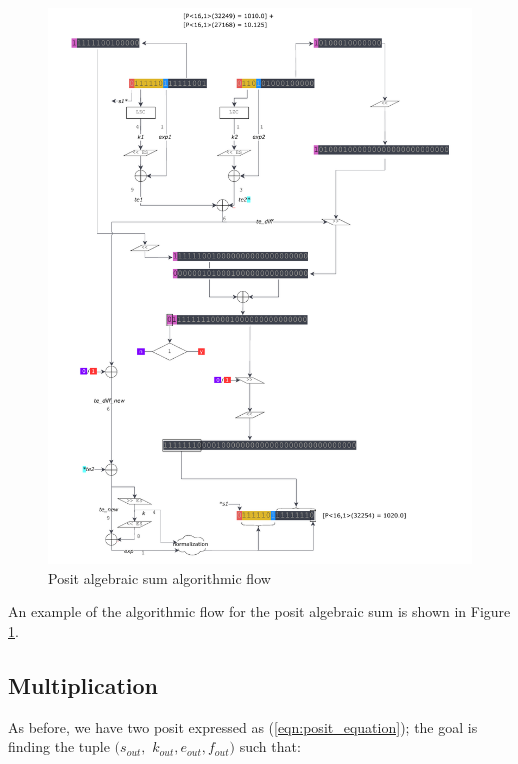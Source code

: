 \begin{figure}
    \begin{center}
    \includegraphics[width=\textwidth]{figures/addition_flow.pdf}
    \caption{Posit algebraic sum algorithmic flow}
    \label{fig:additionflow}
    \end{center}
\end{figure}

An example of the algorithmic flow for the posit algebraic sum is shown in Figure \ref{fig:additionflow}.

\subsection{Multiplication}\label{Multiplication}

As before, we have two posit expressed as (\eqref{eqn:posit_equation}); the goal is finding the tuple $(s_{out},$ $k_{out}, e_{out}, f_{out})$ such that:


